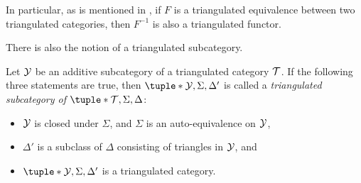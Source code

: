 In particular, as is mentioned in \cite[p.\ 4]{Happel_1988}, if \( F \) is a triangulated equivalence between two triangulated categories, then \( F^{-1} \) is also a triangulated functor.

There is also the notion of a triangulated subcategory.
\begin{definition}
    Let \( {\mathcal{Y}} \) be an additive subcategory of a triangulated category \( {\mathcal{T}} \). If the following three statements are true, then \( \tuple*{\Yc, \Sigma, \Delta'} \) is called a \emph{triangulated subcategory of \( \tuple*{\Tc, \Sigma, \Delta} \)}:
    \begin{itemize}
        \item {
            \( {\mathcal{Y}} \) is closed under \( \Sigma \), and \( \Sigma \) is an auto-equivalence on \( {\mathcal{Y}} \),
        }
        \item {
            \( \Delta' \) is a subclass of \( \Delta \) consisting of triangles in \( {\mathcal{Y}} \), and
        }
        \item {
            \( \tuple*{\Yc, \Sigma, \Delta'} \) is a triangulated category.
        }
    \end{itemize}
\end{definition}